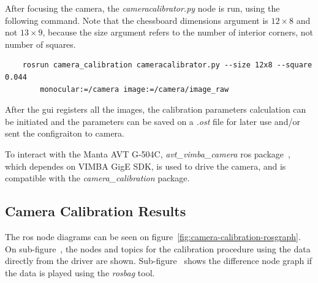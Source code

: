 After focusing the camera, the \emph{cameracalibrator.py} node is run, using the following command. Note that the chessboard dimensions argument is $12\times 8$ and not $13 \times 9$, because the size argument refers to the number of interior corners, not number of squares.


\begin{verbatim}
    rosrun camera_calibration cameracalibrator.py --size 12x8 --square 0.044  
        monocular:=/camera image:=/camera/image_raw
\end{verbatim}


After the \ac{gui} registers all the images, the calibration parameters calculation can be initiated and the parameters can be saved on a \textit{.ost} file for later use and/or sent the configraiton to camera. 

To interact with the Manta AVT G-504C, \emph{avt\_vimba\_camera} \ac{ros} package~\cite{AVTROSdriver}, which dependes on VIMBA GigE SDK, is used to drive the camera, and is compatible with the \emph{camera\_calibration} package. 

\subsection{Camera Calibration Results}
The \ac{ros} node diagrams can be seen on figure~\ref{fig:camera-calibration-rosgraph}. On sub-figure~, the nodes and topics for the calibration procedure using the data directly from the driver are shown. Sub-figure~ shows the difference node graph if the data is played using the \emph{rosbag} tool.


